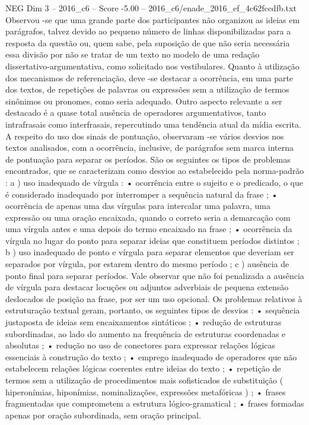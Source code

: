 \begin{textsample}{NEG Dim 3 – 2016\_c6 – Score -5.00 – 2016\_c6/enade\_2016\_ef\_4c62fccdfb.txt}
Observou -se que uma grande parte dos participantes não organizou as ideias em parágrafos, talvez devido ao pequeno número de linhas disponibilizadas para a resposta da questão ou, quem sabe, pela suposição de que não seria necessária essa divisão por não se tratar de um texto no modelo de uma redação dissertativo-argumentativa, como solicitado nos vestibulares.
Quanto à utilização dos mecanismos de referenciação, deve -se destacar a ocorrência, em uma parte dos textos, de repetições de palavras ou expressões sem a utilização de termos sinônimos ou pronomes, como seria adequado.
Outro aspecto relevante a ser destacado é a quase total ausência de operadores argumentativos, tanto intrafrasais como interfrasais, repercutindo uma tendência atual da mídia escrita.
A respeito do uso dos sinais de pontuação, observaram -se vários desvios nos textos analisados, com a ocorrência, inclusive, de parágrafos sem marca interna de pontuação para separar os períodos.
São os seguintes os tipos de problemas encontrados, que se caracterizam como desvios ao estabelecido pela norma-padrão : a ) uso inadequado de vírgula : • ocorrência entre o sujeito e o predicado, o que é considerado inadequado por interromper a sequência natural da frase ; • ocorrência de apenas uma das vírgulas para intercalar uma palavra, uma expressão ou uma oração encaixada, quando o correto seria a demarcação com uma vírgula antes e uma depois do termo encaixado na frase ; • ocorrência da vírgula no lugar do ponto para separar ideias que constituem períodos distintos ; b ) uso inadequado de ponto e vírgula para separar elementos que deveriam ser separados por vírgula, por estarem dentro do mesmo período ; c ) ausência de ponto final para separar períodos.
Vale observar que não foi penalizada a ausência de vírgula para destacar locuções ou adjuntos adverbiais de pequena extensão deslocados de posição na frase, por ser um uso opcional.
Os problemas relativos à estruturação textual geram, portanto, os seguintes tipos de desvios : • sequência justaposta de ideias sem encaixamentos sintáticos ; • redução de estruturas subordinadas, ao lado do aumento na frequência de estruturas coordenadas e absolutas ; • redução no uso de conectores para expressar relações lógicas essenciais à construção do texto ; • emprego inadequado de operadores que não estabelecem relações lógicas coerentes entre ideias do texto ; • repetição de termos sem a utilização de procedimentos mais sofisticados de substituição ( hiperonímias, hiponímias, nominalizações, expressões metafóricas ) ; • frases fragmentadas que comprometem a estrutura lógico-gramatical ; • frases formadas apenas por oração subordinada, sem oração principal.

\end{textsample}
